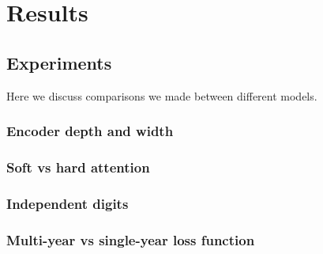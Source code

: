 \section{Results}



\subsection{Experiments}

Here we discuss comparisons we made between different models.

\subsubsection{Encoder depth and width} \label{sssec:exp_encoder}


\subsubsection{Soft vs hard attention}

\subsubsection{Independent digits} \label{sssec:ind_digits}

\subsubsection{Multi-year vs single-year loss function}
